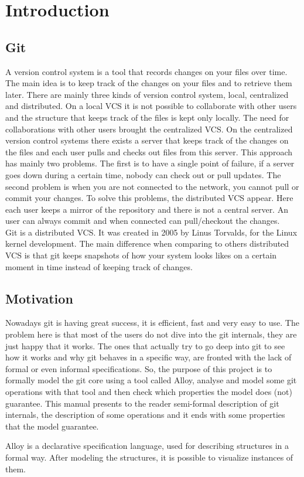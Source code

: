 \section{Introduction}
\subsection{Git}
A version control system is a tool that records changes on your
files over time. The main idea is to keep track of the changes on your
files and to retrieve them later. There are mainly three kinds of 
version control system, local, centralized and distributed. On
a local VCS it is not possible to collaborate with other users and
the structure that keeps track of the files is kept only locally. The
need for collaborations with other users brought the centralized VCS.
On the centralized version control systems there exists a server that keeps
track of the changes on the files and each user pulls and checks out files
from this server. This approach has mainly two problems. The
first is to have a single point of failure, if a server goes down
during a certain time, nobody can check out or pull updates. The
second problem is when you are not connected to the network, you
cannot pull or commit your changes. To solve this problems, the
distributed VCS appear. Here each user keeps a mirror of the
repository and there is not a central server. An user can always commit
and when connected can pull/checkout the changes.\\

Git is a distributed VCS. It was created in 2005 by Linus Torvalds,
for the Linux kernel development. The main difference when comparing to
others distributed VCS is that git keeps snapshots of how your system
looks likes on a certain moment in time instead of keeping track of
changes.\par
\subsection{Motivation}
Nowadays git is having great success, it is efficient, fast and very
easy to use. The problem here is that most of the users do not dive
into the git internals, they are just happy that it works. The ones
that actually try to go deep into git to see how it works and why git
behaves in a specific way, are fronted with the lack of formal or even
informal specifications.  So, the purpose of this project is to
formally model the git core using a tool called 
Alloy, analyse and model some git
operations with that tool and then check which properties the model does (not)
guarantee. This manual presents to the reader semi-formal description of
git internals, the description of some operations and it ends with
some properties that the model guarantee.\par
Alloy is a declarative specification language, used for describing structures in 
a formal way. After modeling the structures, it is possible to visualize 
instances of them. \\

